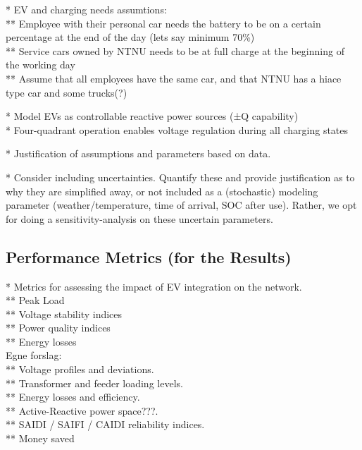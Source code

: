 * EV and charging needs assumtions: \\
** Employee with their personal car needs the battery to be on a certain percentage at the end of the day (lets say minimum 70\%) \\
** Service cars owned by NTNU needs to be at full charge at the beginning of the working day \\
** Assume that all employees have the same car, and that NTNU has a hiace type car and some trucks(?)

* Model EVs as controllable reactive power sources (±Q capability) \\
* Four-quadrant operation enables voltage regulation during all charging states



* Justification of assumptions and parameters based on data. 

* Consider including uncertainties. Quantify these and provide justification as to why they are simplified away, or not included as a (stochastic) modeling parameter (weather/temperature, time of arrival, SOC after use). Rather, we opt for doing a sensitivity-analysis on these uncertain parameters.

\subsection{Performance Metrics (for the Results)}

* Metrics for assessing the impact of EV integration on the network. \\ 
** Peak Load \\
** Voltage stability indices \\
** Power quality indices \\
** Energy losses \\

Egne forslag: \\
** Voltage profiles and deviations. \\ 
** Transformer and feeder loading levels. \\
** Energy losses and efficiency. \\
** Active-Reactive power space???. \\
** SAIDI / SAIFI / CAIDI reliability indices. \\
** Money saved \\ 

